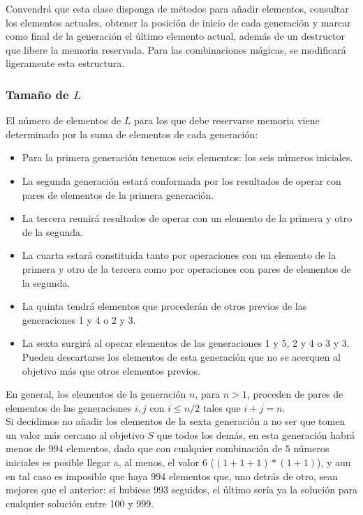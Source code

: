 Convendrá que esta clase disponga de métodos para añadir elementos, consultar los elementos actuales, obtener la posición de inicio de cada generación y marcar como final de la generación el último elemento actual, además de un destructor que libere la memoria reservada. Para las combinaciones mágicas, se modificará ligeramente esta estructura. \\

\subsubsection{Tamaño de $L$}

El número de elementos de $L$ para los que debe reservarse memoria viene determinado por la suma de elementos de cada generación:
\begin{itemize}
	\item Para la primera generación tenemos seis elementos: los seis números iniciales.
	\item La segunda generación estará conformada por los resultados de operar con pares de elementos de la primera generación.
	\item La tercera reunirá resultados de operar con un elemento de la primera y otro de la segunda.
	\item La cuarta estará constituida tanto por operaciones con un elemento de la primera y otro de la tercera como por operaciones con pares de elementos de la segunda.
	\item La quinta tendrá elementos que procederán de otros previos de las generaciones 1 y 4 o 2 y 3.
	\item La sexta surgirá al operar elementos de las generaciones 1 y 5, 2 y 4 o 3 y 3. Pueden descartarse los elementos de esta generación que no se acerquen al objetivo más que otros elementos previos.
\end{itemize}

En general, los elementos de la generación $n$, para $n>1$, proceden de pares de elementos de las generaciones $i,j$ con $i \le n/2$ tales que $i+j=n$.\\

Si decidimos no añadir los elementos de la sexta generación a no ser que tomen un valor más cercano al objetivo $S$ que todos los demás, en esta generación habrá menos de $994$ elementos, dado que con cualquier combinación de $5$ números iniciales es posible llegar a, al menos, el valor $6$ ($(1+1+1)*(1+1)$), y aun en tal caso es imposible que haya $994$ elementos que, uno detrás de otro, sean mejores que el anterior: si hubiese $993$ seguidos, el último sería ya la solución para cualquier solución entre 100 y 999.\\

